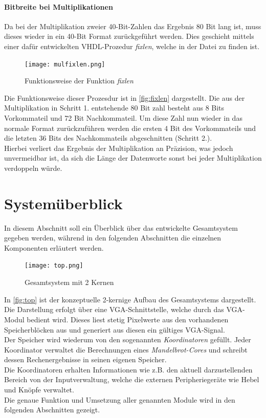 \documentclass[a4paper,12pt,onesided]{report}
\begin{document}
\paragraph{Bitbreite bei Multiplikationen}
Da bei der Multiplikation zweier 40-Bit-Zahlen das Ergebnis 80 Bit lang ist, muss dieses wieder in ein 40-Bit Format zurückgeführt werden.
Dies geschieht mittels einer dafür entwickelten VHDL-Prozedur \textit{fixlen}, welche in der Datei %
zu finden ist.

\begin{figure}[H]
	\centering
	\texttt{[image: mulfixlen.png]}
	\caption{Funktionsweise der Funktion \textit{fixlen}}
	\label{fig:fixlen}
\end{figure}

Die Funktionsweise dieser Prozesdur ist in \autoref{fig:fixlen} dargestellt.
Die aus der Multiplikation in Schritt 1. entstehende 80 Bit zahl besteht aus 8 Bits Vorkommateil und 72 Bit Nachkommateil.
Um diese Zahl nun wieder in das normale Format zurückzuführen werden die ersten 4 Bit des Vorkommateils und die letzten 36 Bits des Nachkommateils abgeschnitten (Schritt 2.).\\
Hierbei verliert das Ergebnis der Multiplikation an Präzision, was jedoch unvermeidbar ist, da sich die Länge der Datenworte sonst bei jeder Multiplikation verdoppeln würde.

\section{Systemüberblick}
\label{sec:überblick}
In diesem Abschnitt soll ein Überblick über das entwickelte Gesamtsystem gegeben werden, während in den folgenden Abschnitten die einzelnen Komponenten erläutert werden.

\begin{figure}[H]
	\centering
	\texttt{[image: top.png]}
	\caption{Gesamtsystem mit 2 Kernen}
	\label{fig:top}
\end{figure}

In \autoref{fig:top} ist der konzeptuelle 2-kernige Aufbau des Gesamtsystems dargestellt.\\
Die Darstellung erfolgt über eine VGA-Schnittstelle, welche durch das VGA-Modul bedient wird.
Dieses liest stetig Pixelwerte aus den vorhandenen Speicherblöcken aus und generiert aus diesen ein gültiges VGA-Signal.\\
Der Speicher wird wiederum von den sogenannten \textit{Koordinatoren} gefüllt.
Jeder Koordinator verwaltet die Berechnungen eines \textit{Mandelbrot-Cores} und schreibt dessen Rechenergebnisse in seinen eigenen Speicher.\\
Die Koordinatoren erhalten Informationen wie z.B. den aktuell darzustellenden Bereich von der Inputverwaltung, welche die externen Peripheriegeräte wie Hebel und Knöpfe verwaltet.\\
Die genaue Funktion und Umsetzung aller genannten Module wird in den folgenden Abschnitten gezeigt.
\end{document}
